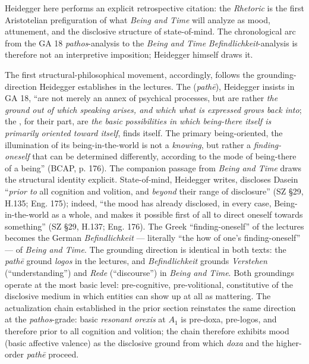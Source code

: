 Heidegger here performs an explicit retrospective citation: the \textit{Rhetoric} is the first Aristotelian prefiguration of what \textit{Being and Time} will analyze as mood, attunement, and the disclosive structure of state-of-mind. The chronological arc from the GA 18 \textit{pathos}-analysis to the \textit{Being and Time} \textit{Befindlichkeit}-analysis is therefore not an interpretive imposition; Heidegger himself draws it.

The first structural-philosophical movement, accordingly, follows the grounding-direction Heidegger establishes in the lectures. The  (\textit{pathē}), Heidegger insists in GA 18, ``are not merely an annex of psychical processes, but are rather \textit{the ground out of which speaking arises, and which what is expressed grows back into}; the , for their part, are \textit{the basic possibilities in which being-there itself is primarily oriented toward itself}, finds itself. The primary being-oriented, the illumination of its being-in-the-world is not a \textit{knowing}, but rather a \textit{finding-oneself} that can be determined differently, according to the mode of being-there of a being'' (BCAP, p. 176). The companion passage from \textit{Being and Time} draws the structural identity explicit. State-of-mind, Heidegger writes, discloses Dasein ``\textit{prior to} all cognition and volition, and \textit{beyond} their range of disclosure'' (SZ \S29, H.135; Eng. 175); indeed, ``the mood has already disclosed, in every case, Being-in-the-world as a whole, and makes it possible first of all to direct oneself towards something'' (SZ \S29, H.137; Eng. 176). The Greek ``finding-oneself'' of the lectures becomes the German \textit{Befindlichkeit} --- literally ``the how of one's finding-oneself'' --- of \textit{Being and Time}. The grounding direction is identical in both texts: the \textit{pathē} ground \textit{logos} in the lectures, and \textit{Befindlichkeit} grounds \textit{Verstehen} (``understanding'') and \textit{Rede} (``discourse'') in \textit{Being and Time}. Both groundings operate at the most basic level: pre-cognitive, pre-volitional, constitutive of the disclosive medium in which entities can show up at all as mattering. The actualization chain established in the prior section reinstates the same direction at the \textit{pathos}-grade: basic \textit{resonant orexis} at $A_1$ is pre-doxa, pre-logos, and therefore prior to all cognition and volition; the chain therefore exhibits mood (basic affective valence) as the disclosive ground from which \textit{doxa} and the higher-order \textit{pathē} proceed.

